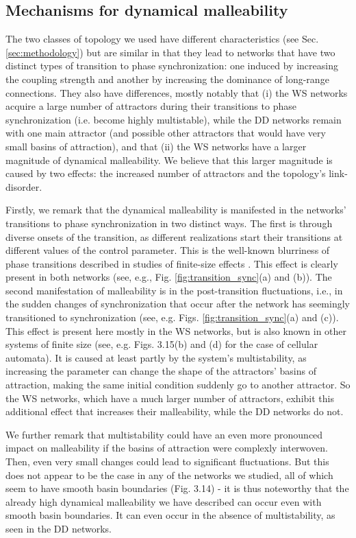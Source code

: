 \subsection*{Mechanisms for dynamical malleability}
The two classes of topology we used have different characteristics (see Sec. \ref{sec:methodology}) but are similar in that they lead to networks that have two distinct types of transition to phase synchronization: one induced by increasing the coupling strength and another by increasing the dominance of long-range connections. They also have differences, mostly notably that (i) the WS networks acquire a large number of attractors during their transitions to phase synchronization (i.e. become highly multistable), while the DD networks remain with one main attractor (and possible other attractors that would have very small basins of attraction), and that (ii) the WS networks have a larger magnitude of dynamical malleability. We believe that this larger magnitude is caused by two effects: the increased number of attractors and the topology's link-disorder.

Firstly, we remark that the dynamical malleability is manifested in the networks' transitions to phase synchronization in two distinct ways. The first is through diverse onsets of the transition, as different realizations start their transitions at different values of the control parameter. This is the well-known blurriness of phase transitions described in studies of finite-size effects \cite{brankov2000theory, binder1987finite}. This effect is clearly present in both networks (see, e.g., Fig. \ref{fig:transition_sync}(a) and (b)). The second manifestation of malleability is in the post-transition fluctuations, i.e., in the sudden changes of synchronization that occur after the network has seemingly transitioned to synchronization (see, e.g. Figs. \ref{fig:transition_sync}(a) and (c)). This effect is present here mostly in the WS networks, but is also known in other systems of finite size (see, e.g. Figs. 3.15(b) and (d) for the case of cellular automata). It is caused at least partly by the system's multistability, as increasing the parameter can change the shape of the attractors' basins of attraction, making the same initial condition suddenly go to another attractor. So the WS networks, which have a much larger number of attractors, exhibit this additional effect that increases their malleability, while the DD networks do not.

We further remark that multistability could have an even more pronounced impact on malleability if the basins of attraction were complexly interwoven. Then, even very small changes could lead to significant fluctuations. But this does not appear to be the case in any of the networks we studied, all of which seem to have smooth basin boundaries (Fig. 3.14) - it is thus noteworthy that the already high dynamical malleability we have described can occur even with smooth basin boundaries. It can even occur in the absence of multistability, as seen in the DD networks.

